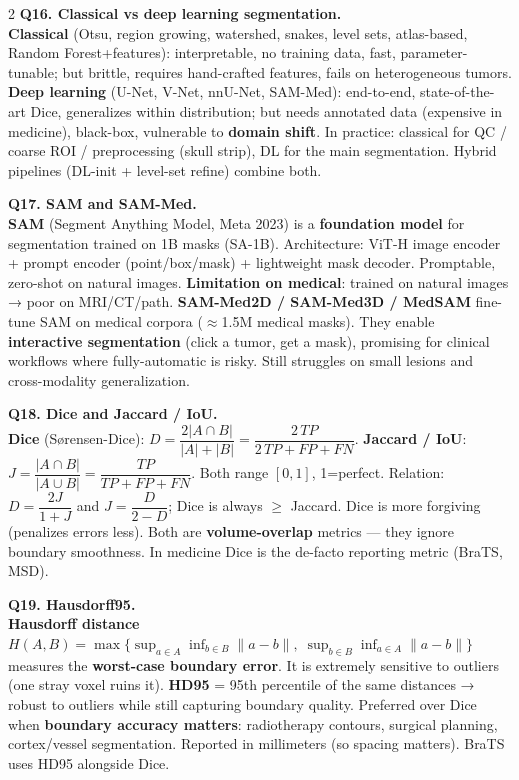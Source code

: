\begin{paracol}{2}
\textbf{Q16. Classical vs deep learning segmentation.}\\
\textbf{Classical} (Otsu, region growing, watershed, snakes, level sets, atlas-based, Random Forest+features): interpretable, no training data, fast, parameter-tunable; but brittle, requires hand-crafted features, fails on heterogeneous tumors. \textbf{Deep learning} (U-Net, V-Net, nnU-Net, SAM-Med): end-to-end, state-of-the-art Dice, generalizes within distribution; but needs annotated data (expensive in medicine), black-box, vulnerable to \textbf{domain shift}. In practice: classical for QC / coarse ROI / preprocessing (skull strip), DL for the main segmentation. Hybrid pipelines (DL-init + level-set refine) combine both.

\textbf{Q17. SAM and SAM-Med.}\\
\textbf{SAM} (Segment Anything Model, Meta 2023) is a \textbf{foundation model} for segmentation trained on 1B masks (SA-1B). Architecture: ViT-H image encoder + prompt encoder (point/box/mask) + lightweight mask decoder. Promptable, zero-shot on natural images. \textbf{Limitation on medical}: trained on natural images → poor on MRI/CT/path. \textbf{SAM-Med2D / SAM-Med3D / MedSAM} fine-tune SAM on medical corpora ($\approx$1.5M medical masks). They enable \textbf{interactive segmentation} (click a tumor, get a mask), promising for clinical workflows where fully-automatic is risky. Still struggles on small lesions and cross-modality generalization.

\textbf{Q18. Dice and Jaccard / IoU.}\\
\textbf{Dice} (Sørensen-Dice): $D=\dfrac{2|A\cap B|}{|A|+|B|}=\dfrac{2\,TP}{2\,TP+FP+FN}.$ \textbf{Jaccard / IoU}: $J=\dfrac{|A\cap B|}{|A\cup B|}=\dfrac{TP}{TP+FP+FN}.$ Both range $[0,1]$, 1=perfect. Relation: $D=\dfrac{2J}{1+J}$ and $J=\dfrac{D}{2-D}$; Dice is always $\geq$ Jaccard. Dice is more forgiving (penalizes errors less). Both are \textbf{volume-overlap} metrics — they ignore boundary smoothness. In medicine Dice is the de-facto reporting metric (BraTS, MSD).

\textbf{Q19. Hausdorff95.}\\
\textbf{Hausdorff distance} $H(A,B)=\max\{\sup_{a\in A}\inf_{b\in B}\|a-b\|,\;\sup_{b\in B}\inf_{a\in A}\|a-b\|\}$ measures the \textbf{worst-case boundary error}. It is extremely sensitive to outliers (one stray voxel ruins it). \textbf{HD95} = 95th percentile of the same distances → robust to outliers while still capturing boundary quality. Preferred over Dice when \textbf{boundary accuracy matters}: radiotherapy contours, surgical planning, cortex/vessel segmentation. Reported in millimeters (so spacing matters). BraTS uses HD95 alongside Dice.


\end{paracol}
